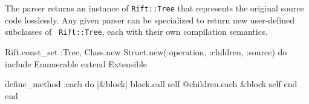 \documentclass{report}
\begin{document}
    The parser returns an instance of {\tt Rift::Tree} that represents the original source code losslessly. Any given parser can be specialized to return new user-defined subclasses of {\tt
    Rift::Tree}, each with their own compilation semantics.

\begin{rubycode}
Rift.const_set :Tree, Class.new Struct.new(:operation, :children, :source) do
  include Enumerable
  extend  Extensible

  define_method :each do |&block|
    block.call self
    @children.each &block
    self
  end
end \end{rubycode}
\end{document}
